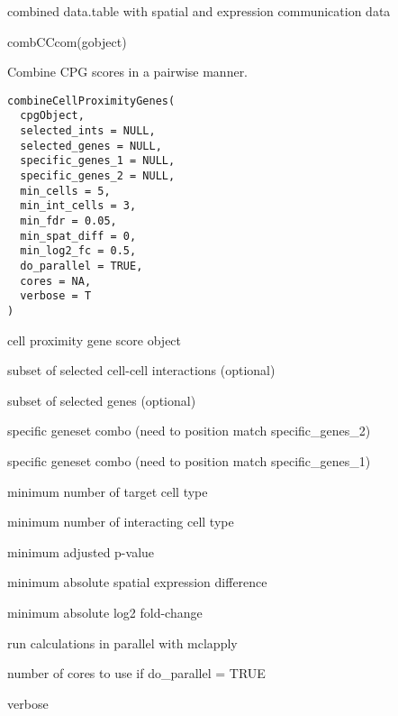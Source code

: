 \documentclass[a4paper]{book}
\begin{document}
%
\begin{Value}
combined data.table with spatial and expression communication data
\end{Value}
%
\begin{Examples}
\begin{ExampleCode}
    combCCcom(gobject)
\end{ExampleCode}
\end{Examples}
%
\begin{Description}\relax
Combine CPG scores in a pairwise manner.
\end{Description}
%
\begin{Usage}
\begin{verbatim}
combineCellProximityGenes(
  cpgObject,
  selected_ints = NULL,
  selected_genes = NULL,
  specific_genes_1 = NULL,
  specific_genes_2 = NULL,
  min_cells = 5,
  min_int_cells = 3,
  min_fdr = 0.05,
  min_spat_diff = 0,
  min_log2_fc = 0.5,
  do_parallel = TRUE,
  cores = NA,
  verbose = T
)
\end{verbatim}
\end{Usage}
%
\begin{Arguments}
\begin{ldescription}
\item[\code{cpgObject}] cell proximity gene score object

\item[\code{selected\_ints}] subset of selected cell-cell interactions (optional)

\item[\code{selected\_genes}] subset of selected genes (optional)

\item[\code{specific\_genes\_1}] specific geneset combo (need to position match specific\_genes\_2)

\item[\code{specific\_genes\_2}] specific geneset combo (need to position match specific\_genes\_1)

\item[\code{min\_cells}] minimum number of target cell type

\item[\code{min\_int\_cells}] minimum number of interacting cell type

\item[\code{min\_fdr}] minimum adjusted p-value

\item[\code{min\_spat\_diff}] minimum absolute spatial expression difference

\item[\code{min\_log2\_fc}] minimum absolute log2 fold-change

\item[\code{do\_parallel}] run calculations in parallel with mclapply

\item[\code{cores}] number of cores to use if do\_parallel = TRUE

\item[\code{verbose}] verbose
\end{ldescription}
\end{Arguments}
\end{document}
